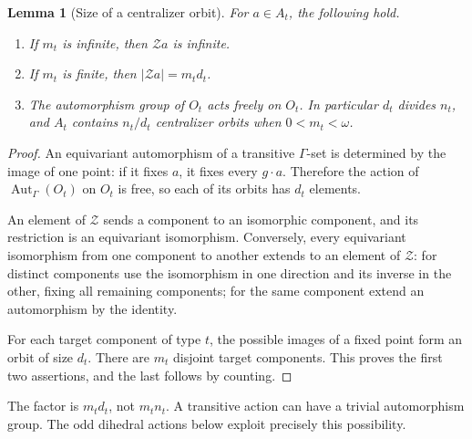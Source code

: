 \documentclass[11pt,letterpaper]{article}
\newtheorem{lemma}[lemma]{Lemma}\aliascntresetthe{lemma}
\theoremstyle{definition}
\theoremstyle{remark}
\newcommand{\Aut}{\operatorname{Aut}}
\newcommand{\lbl}[1]{\nolinkurl{#1}}
\newcommand{\repo}[1]{\nolinkurl{#1}}
\newcommand{\abs}[1]{\lvert #1\rvert}
\begin{document}
\begin{lemma}[Size of a centralizer orbit]\label{hset:ns:lem:centralizer}
For $a\in A_t$, the following hold.
\begin{enumerate}
\item If $m_t$ is infinite, then $\mathcal Z a$ is infinite.
\item If $m_t$ is finite, then $\abs{\mathcal Z a}=m_t d_t$.
\item The automorphism group of $O_t$ acts freely on $O_t$. In particular $d_t$ divides $n_t$, and $A_t$ contains $n_t/d_t$ centralizer orbits when $0<m_t<\omega$.
\end{enumerate}
\end{lemma}
\begin{proof}
An equivariant automorphism of a transitive $\Gamma$-set is determined by the image of one point: if it fixes $a$, it fixes every $g\cdot a$. Therefore the action of $\Aut_\Gamma(O_t)$ on $O_t$ is free, so each of its orbits has $d_t$ elements.

An element of $\mathcal Z$ sends a component to an isomorphic component, and its restriction is an equivariant isomorphism. Conversely, every equivariant isomorphism from one component to another extends to an element of $\mathcal Z$: for distinct components use the isomorphism in one direction and its inverse in the other, fixing all remaining components; for the same component extend an automorphism by the identity.

For each target component of type $t$, the possible images of a fixed point form an orbit of size $d_t$. There are $m_t$ disjoint target components. This proves the first two assertions, and the last follows by counting.
\end{proof}

The factor is $m_td_t$, not $m_tn_t$. A transitive action can have a trivial automorphism group. The odd dihedral actions below exploit precisely this possibility.

\noindent[Added 4 October 2026, batch~96: Lemma~26.3 of
\repo{naming-elementary-embeddings} (Part~III, \lbl{nee:aa:lem:mult}, batch-96
manuscript~05, written later and independently, citing this Part only for
\cref{hset:ns:thm:graded}) proves the same statement for a finite tuple of
named atom \emph{injections}, whose components need not be orbits of a group,
and for \emph{infinite} components: $\abs{\mathcal Z a}=\mu_t\delta_t$ as a
cardinal identity, with $\mu_t$ the number of copies (here $m_t$) and
$\delta_t=\abs{\Aut(X_t)}\le\aleph_0$ (here $d_t$), the automorphism group
acting freely. It is used there, with pure-real ``rooted codes'' of
components, to show that for every infinite cutoff $\kappa$ the atoms
occurring in objects definable from given parameters and finitely many pure
reals are the component saturation of the parameters' kernels together with
the atoms whose centralizer orbit has fewer than $\kappa$ elements (its
Theorem~27.1, \lbl{nee:aa:thm:kernel}). AI-assisted, unrefereed, not
formalized.]
\end{document}
